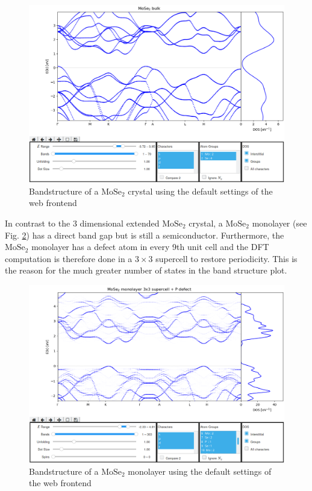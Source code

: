 \begin{figure}[htb!]
    \centering
    \includegraphics[width=1.0\linewidth]{img/gui_web_mose2_crystal.png}
    \caption[Bandstructure of a $\textrm{MoSe}_2$ crystal]{Bandstructure of a $\textrm{MoSe}_2$ crystal using the default settings of the web frontend}
    \label{example1}
\end{figure}

In contrast to the 3 dimensional extended $\textrm{MoSe}_2$ crystal, a $\textrm{MoSe}_2$ monolayer (see Fig. \ref{example2}) has a direct band gap but is still a semiconductor. Furthermore, the $\textrm{MoSe}_2$ monolayer has a defect atom in every 9th unit cell and the DFT computation is therefore done in a $3 \times 3$ supercell to restore periodicity. This is the reason for the much greater number of states in the band structure plot. 

\begin{figure}[htb!]
    \centering
    \includegraphics[width=1.0\linewidth]{img/gui_web_mose2_monolayer_unfold-1.png}
    \caption[Bandstructure of a $\textrm{MoSe}_2$ monolayer]{Bandstructure of a $\textrm{MoSe}_2$ monolayer using the default settings of the web frontend}
    \label{example2}
\end{figure}

